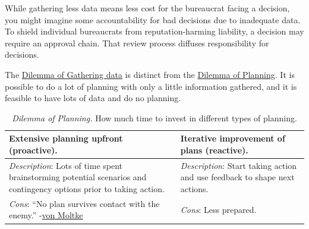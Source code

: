 While gathering less data means less cost for the bureaucrat facing a decision, you might imagine some accountability for bad decisions due to inadequate data. To shield individual bureaucrats from reputation-harming liability, a decision may require an approval chain. That review process diffuses responsibility for decisions.


The \hyperref[table:dilemma-personal-gather-data-lots-vs-little]{Dilemma of Gathering data} is distinct from the \hyperref[table:dilemma-personal-planning-vs-iterate]{Dilemma of Planning}. It is possible to do a lot of planning with only a little information gathered, and it is feasible to have lots of data and do no planning. 

\begin{center}
\begin{table}[H] %
\begin{tabular}{ | m{\dilemmatablewidth}| m{\dilemmatablewidth} | } 
  \hline
  \textbf{Extensive planning upfront (proactive).} & 
  \textbf{Iterative improvement of plans (reactive).} \\ 
  \hline
  \textit{Description}: Lots of time spent brainstorming potential scenarios and contingency options prior to taking action. & 
  \textit{Description}: Start taking action and use feedback to shape next actions. \\ 
  \hline
  \textit{Cons}: ``No plan survives contact with the enemy.'' {\small -\href{https://en.wikipedia.org/wiki/Helmuth_von_Moltke_the_Elder}{von Moltke}
  \index{Wikipedia!\href{https://en.wikipedia.org/wiki/Helmuth_von_Moltke_the_Elder}{Helmuth von Moltke}}
  } & 
  \textit{Cons}: Less prepared. \\  
  \hline
\end{tabular}
\caption{
\textit{Dilemma of Planning.}
How much time to invest in different types of planning.
}
\label{table:dilemma-personal-planning-vs-iterate}
\end{table}
\end{center}

